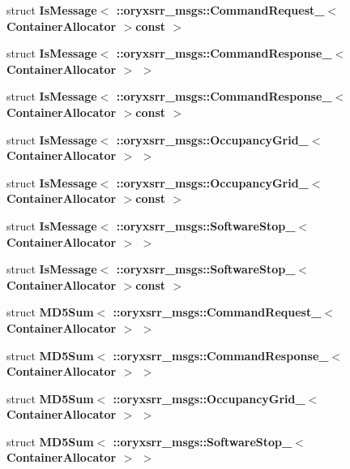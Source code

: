 \begin{DoxyCompactItemize}
\item 
struct {\bf \-Is\-Message$<$ \-::oryxsrr\-\_\-msgs\-::\-Command\-Request\-\_\-$<$ Container\-Allocator $>$const  $>$}
\item 
struct {\bf \-Is\-Message$<$ \-::oryxsrr\-\_\-msgs\-::\-Command\-Response\-\_\-$<$ Container\-Allocator $>$ $>$}
\item 
struct {\bf \-Is\-Message$<$ \-::oryxsrr\-\_\-msgs\-::\-Command\-Response\-\_\-$<$ Container\-Allocator $>$const  $>$}
\item 
struct {\bf \-Is\-Message$<$ \-::oryxsrr\-\_\-msgs\-::\-Occupancy\-Grid\-\_\-$<$ Container\-Allocator $>$ $>$}
\item 
struct {\bf \-Is\-Message$<$ \-::oryxsrr\-\_\-msgs\-::\-Occupancy\-Grid\-\_\-$<$ Container\-Allocator $>$const  $>$}
\item 
struct {\bf \-Is\-Message$<$ \-::oryxsrr\-\_\-msgs\-::\-Software\-Stop\-\_\-$<$ Container\-Allocator $>$ $>$}
\item 
struct {\bf \-Is\-Message$<$ \-::oryxsrr\-\_\-msgs\-::\-Software\-Stop\-\_\-$<$ Container\-Allocator $>$const  $>$}
\item 
struct {\bf \-M\-D5\-Sum$<$ \-::oryxsrr\-\_\-msgs\-::\-Command\-Request\-\_\-$<$ Container\-Allocator $>$ $>$}
\item 
struct {\bf \-M\-D5\-Sum$<$ \-::oryxsrr\-\_\-msgs\-::\-Command\-Response\-\_\-$<$ Container\-Allocator $>$ $>$}
\item 
struct {\bf \-M\-D5\-Sum$<$ \-::oryxsrr\-\_\-msgs\-::\-Occupancy\-Grid\-\_\-$<$ Container\-Allocator $>$ $>$}
\item 
struct {\bf \-M\-D5\-Sum$<$ \-::oryxsrr\-\_\-msgs\-::\-Software\-Stop\-\_\-$<$ Container\-Allocator $>$ $>$}
\end{DoxyCompactItemize}
